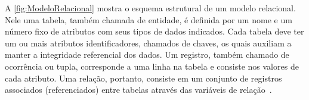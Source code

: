 A \autoref{fig:ModeloRelacional} mostra o esquema estrutural de um modelo relacional. Nele uma tabela, também chamada de entidade, é definida por um nome e um número fixo de atributos com seus tipos de dados indicados. 
Cada tabela deve ter um ou mais atributos identificadores, chamados de chaves, os quais auxiliam a manter a integridade referencial dos dados. 
Um registro, também chamado de ocorrência ou tupla, corresponde a uma linha na tabela e consiste nos valores de cada atributo. 
Uma relação, portanto, consiste em um conjunto de registros associados (referenciados) entre tabelas através das variáveis de relação~\cite{Ramakrishnan:2002}.

    

    
